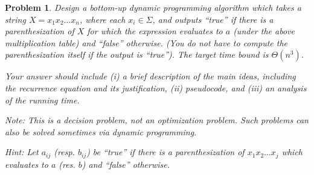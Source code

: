 \documentclass[a4paper]{article}
\newtheorem*{problem}{Problem}
\begin{document}
\begin{enumerate}
\begin{problem}
      Design a bottom-up dynamic programming algorithm which takes a string $X = x_1 x_2 \dots x_n$, where each $x_i \in \Sigma$, and outputs ``true''
      if there is a parenthesization of $X$ for which the expression evaluates to $a$ (under the above multiplication table) and ``false'' otherwise.
      (You do not have to compute the parenthesization itself if the output is ``true''). The target time bound is $\Theta(n^3)$.

      Your answer should include (i) a brief description of the main ideas, including the recurrence equation and its justification, (ii) pseudocode,
      and (iii) an analysis of the running time.

      Note: This is a decision problem, not an optimization problem. Such problems can also be solved sometimes via dynamic programming.

      Hint: Let $a_{ij}$ (resp. $b_{ij}$) be ``true'' if there is a parenthesization of $x_1 x_2 \dots x_j$ which evaluates to $a$ (res. $b$) and
      ``false'' otherwise.

    \end{problem}

\end{enumerate}
\end{document}
